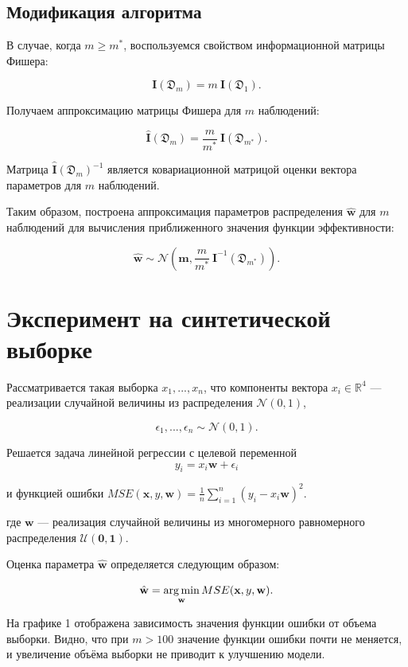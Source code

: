 \documentclass[12pt,twoside]{article}
\begin{document}
\subsection{Модификация алгоритма}

В случае, когда $m \geq m^*$, воспользуемся свойством информационной матрицы Фишера:

$$
\textbf{I}(\mathfrak D_m) =  m~\textbf{I}(\mathfrak D_1).
$$

Получаем аппроксимацию матрицы Фишера для $m$ наблюдений:

$$
\hat{\textbf{I}}(\mathfrak D_m) = \frac{m}{m^{*}} ~\textbf{I}(\mathfrak D_{m^{*}}).
$$

Матрица $\hat{\textbf{I}}(\mathfrak D_m)^{-1}$  является ковариационной матрицой оценки вектора параметров для $m$ наблюдений.

Таким образом, построена аппроксимация параметров распределения $\hat{\textbf{w}}$ для $m$ наблюдений для вычисления приближенного значения функции эффективности:

$$
\hat{\textbf{w}} \sim \mathcal{N}(\textbf{m},  \frac{m}{m^{*}}~\textbf{I}^{-1}(\mathfrak D_{m^{*}})).
$$

\section{Эксперимент на синтетической выборке}

Рассматривается такая выборка $x_1, ..., x_n$, что компоненты вектора $x_i \in \mathds{R}^4$ --- реализации случайной величины из распределения  $\mathcal{N}(0, 1)$, 

$$
\epsilon_1, ..., \epsilon_n \sim \mathcal{N}(0, 1).
$$

Решается задача линейной регрессии с целевой переменной 
$$
y_i = x_i \textbf{w} + \epsilon_i
$$

и функцией ошибки $MSE(\textbf{x}, y, \textbf{w}) = \frac{1}{n}\sum\limits_{i=1}^{n}(y_i - x_i \textbf{w})^2$.

где $\textbf{w}$ --- реализация случайной величины из многомерного равномерного  распределения $\mathcal{U}(\textbf{0}, \textbf{1})$.

Оценка параметра $\hat{\textbf{w}}$ определяется следующим образом:

$$
\hat{\textbf{w}} = \argmin_{\textbf{w}} MSE(\textbf{x}, y, \textbf{w}).
$$

На графике 1 отображена зависимость значения функции ошибки от объема выборки. Видно, что при $m > 100$ значение функции ошибки почти не меняется, и увеличение объёма выборки не приводит к улучшению модели.
\end{document}
